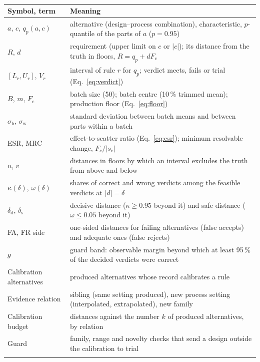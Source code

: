 \documentclass[pdflatex,sn-basic,lineno]{sn-jnl} %
\newcommand{\tabsize}{\fontsize{8}{9.5}\selectfont}
\providecommand{\DIFadd}[1]{{\protect\color{blue}\uwave{#1}}} %
\providecommand{\DIFaddFL}[1]{\DIFadd{#1}} %
\begin{document}
\begin{appendices}
\begin{table}[h]
\tabsize
\setlength{\tabcolsep}{4pt}
\caption{\DIFaddFL{Notation and terms}}\label{tab:notation}
\begin{tabular}{@{}L{2.55cm}L{10.2cm}@{}}
\toprule
Symbol, term & Meaning \\
\midrule
$a$, $c$, $q_p(a,c)$ & alternative (design--process combination), characteristic, $p$-quantile of the parts of $a$ ($p=0.95$) \\
$R$, $d$ & requirement (upper limit on $c$ or $|c|$); its distance from the truth in floors, $R=q_p+dF_c$ \\
$[L_r,U_r]$, $V_r$ & interval of rule $r$ for $q_p$; verdict meets, fails or trial (Eq.~\ref{eq:verdict}) \\
$B$, $m$, $F_c$ & batch size (50); batch centre (10\,\% trimmed mean); production floor (Eq.~\ref{eq:floor}) \\
$\sigma_\mathrm{b}$, $\sigma_\mathrm{w}$ & standard deviation between batch means and between parts within a batch \\
ESR, MRC & effect-to-scatter ratio (Eq.~\ref{eq:esr}); minimum resolvable change, $F_c/|s_c|$ \\
$u$, $v$ & distances in floors by which an interval excludes the truth from above and below \\
$\kappa(\delta)$, $\omega(\delta)$ & shares of correct and wrong verdicts among the feasible verdicts at $|d|=\delta$ \\
$\delta_\mathrm{d}$, $\delta_\mathrm{s}$ & decisive distance ($\kappa\ge0.95$ beyond it) and safe distance ($\omega\le0.05$ beyond it) \\
FA, FR side & one-sided distances for failing alternatives (false accepts) and adequate ones (false rejects) \\
$g$ & guard band: observable margin beyond which at least 95\,\% of the decided verdicts were correct \\
Calibration alternatives & produced alternatives whose record calibrates a rule \\
Evidence relation & sibling (same setting produced), new process setting (interpolated, extrapolated), new family \\
Calibration budget & distances against the number $k$ of produced alternatives, by relation \\
Guard & family, range and novelty checks that send a design outside the calibration to trial \\
\botrule
\end{tabular}
\end{table}


\end{appendices}
\end{document}
